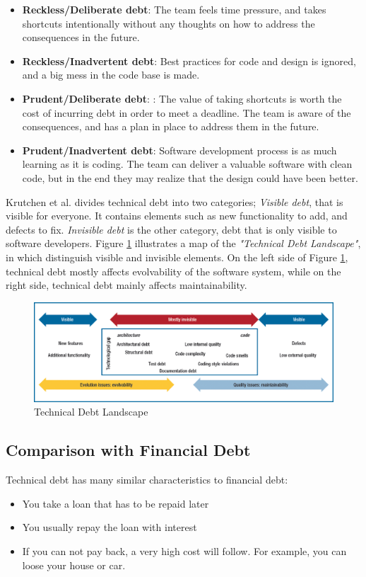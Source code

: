 {\begin{itemize}
	\item \textbf{Reckless/Deliberate debt}: The team feels time pressure, and takes shortcuts intentionally without any thoughts on how to address the consequences in the future.
	\item \textbf{Reckless/Inadvertent debt}: Best practices for code and design is ignored, and a big mess in the code base is made.
	\item \textbf{Prudent/Deliberate debt}: : The value of taking shortcuts is worth the cost of incurring debt in order to meet a deadline. The team is aware of the consequences, and has a plan in place to address them in the future. 
	\item \textbf{Prudent/Inadvertent debt}: Software development process is as much learning as it is coding. The team can deliver a valuable software with clean code, but in the end they may realize that the design could have been better.
\end{itemize}

Krutchen et al.\cite{krutchen} divides technical debt into two categories; \textit{Visible debt}, that is visible for everyone. It contains elements such as new functionality to add, and defects to fix. \textit{Invisible debt} is the other category, debt that is only visible to software developers. Figure \ref{fig:techDebtLandscape} illustrates a map of the \textit{"Technical Debt Landscape"}, in which distinguish visible and invisible elements. On the left side of Figure \ref{fig:techDebtLandscape}, technical debt mostly affects evolvability of the software system, while on the right side, technical debt mainly affects maintainability.

\begin{figure}[ht!]
	\centering
	\includegraphics[width=1.0\textwidth]{images/techDebtLandscape.png}
	\caption{Technical Debt Landscape}
	\label{fig:techDebtLandscape}
\end{figure}

\subsection{Comparison with Financial Debt}
Technical debt has many similar characteristics to financial debt\cite{p50-allman,Zazworka:2011:PDD:1985362.1985372}:
\begin{itemize}
	\item You take a loan that has to be repaid later
	\item You usually repay the loan with interest
	\item If you can not pay back, a very high cost will follow. For example, you can loose your house or car.
\end{itemize}

}
